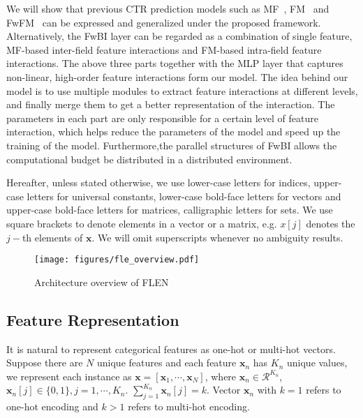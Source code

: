 \documentclass[sigconf]{acmart}
\newcommand{\Real}{\mathcal{R}}
\begin{document}
We will show that previous CTR prediction models such as MF~\citep{Koren2009Matrix}, FM~\citep{rendle2010factorization} and FwFM~\citep{pan2018field} can be expressed and generalized under the proposed framework. 
Alternatively, the FwBI layer can be regarded as a combination of single feature, MF-based inter-field feature interactions and FM-based intra-field feature interactions. The above three parts together with the MLP layer that captures non-linear, high-order feature interactions form our model. The idea behind our model is to use multiple modules to extract feature interactions at different levels, and finally merge them to get a better representation of the interaction. The parameters in each part are only responsible for a certain level of feature interaction, which helps reduce the parameters of the model and speed up the training of the model. Furthermore,the parallel structures of FwBI allows the computational budget be distributed in a distributed environment.

Hereafter, unless stated otherwise, we use lower-case letters for indices, upper-case letters for universal constants, lower-case bold-face letters for vectors and upper-case bold-face letters for matrices, calligraphic letters for sets. We use square brackets to denote elements in a vector or a matrix, e.g. $x[j]$ denotes the $j-$th elements of $\mathbf{x}$. We will omit superscripts whenever no ambiguity results.


\begin{figure}
\centering\texttt{[image: figures/fle\_overview.pdf]}
\caption{Architecture overview of FLEN}
\label{fig:overview}
\end{figure}

\subsection{Feature Representation}\label{sec:feature}

It is natural to represent categorical features as one-hot or multi-hot vectors. 
Suppose there are $N$ unique features and each feature $\mathbf{x}_n$ has $K_n$ unique values, we represent each instance as $\mathbf{x}=[\mathbf{x}_1,\cdots, \mathbf{x}_N]$, where  $\mathbf{x}_n\in\Real^{K_n}$, $\mathbf{x}_n[j]\in\{0,1\}, j=1,\cdots,K_n$. $\sum_{j=1}^{K_n}\mathbf{x}_n[j]=k$. Vector $\mathbf{x}_n$ with $k=1$ refers to one-hot encoding and $k>1$ refers to multi-hot encoding.
\end{document}
